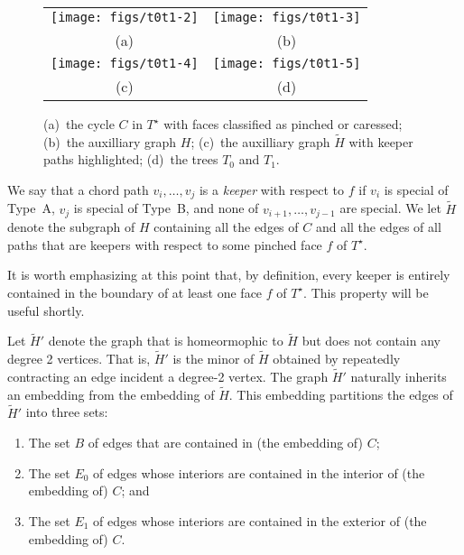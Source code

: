 \documentclass{patmorin}
\newcommand{\dual}[1]{{#1}^\star}
\begin{document}
  \begin{figure}
     \begin{center}\begin{tabular}{cc}
		\texttt{[image: figs/t0t1-2]} &
		\texttt{[image: figs/t0t1-3]} \\
                (a) & (b) \\[1em]
		\texttt{[image: figs/t0t1-4]} & 
		\texttt{[image: figs/t0t1-5]} \\
                (c) & (d)
     \end{tabular}\end{center}
	  \caption{(a)~the cycle $C$ in $\dual{T}$ with faces classified as pinched or caressed; (b)~the auxilliary graph $H$; (c)~the auxilliary graph $\tilde{H}$ with keeper paths highlighted; (d)~the trees $T_0$ and $T_1$.}
  \end{figure}


We say that a chord path $v_i,\ldots,v_j$ is a \emph{keeper} with respect to
$f$ if $v_i$ is special of Type~A, $v_j$ is special of Type~B, and none
of $v_{i+1},\ldots,v_{j-1}$ are special.  We let $\tilde{H}$ denote the
subgraph of $H$ containing all the edges of $C$ and all the edges of
all paths that are keepers with respect to some pinched face $f$ of $\dual{T}$.

It is worth emphasizing at this point that, by definition, every keeper is
entirely contained in the boundary of at least one face $f$ of $\dual{T}$.
This property will be useful shortly.

Let $\tilde{H}'$ denote the graph that is homeormophic to $\tilde{H}$
but does not contain any degree 2 vertices.  That is, $\tilde{H}'$
is the minor of $\tilde{H}$ obtained by repeatedly contracting an edge
incident a degree-2 vertex.  The graph $\tilde{H}'$ naturally inherits an
embedding from the embedding of $\tilde{H}$.  This embedding partitions
the edges of $\tilde{H}'$ into three sets:
\begin{enumerate}
  \item The set $B$ of edges that are contained in (the embedding of) $C$;
  \item The set $E_0$ of edges whose interiors are contained in the
  interior of (the embedding of) $C$; and
  \item The set $E_1$ of edges whose interiors are contained in the
  exterior of (the embedding of) $C$.
\end{enumerate}
\end{document}
